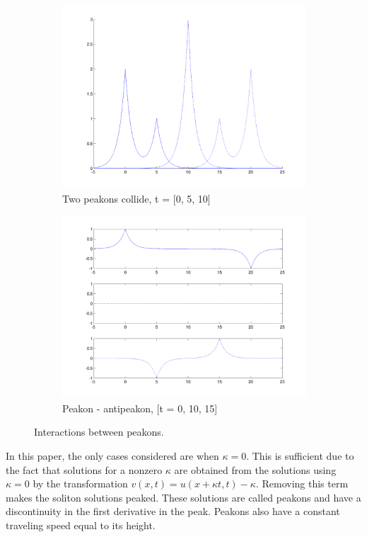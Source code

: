 \begin{figure}[h]
\begin{subfigure}[b]{0.49\textwidth}
                \includegraphics[width=\textwidth]{gfx/peakonovertake}
                \caption{Two peakons collide, t = [0, 5, 10]}
                \label{fig:peakonovertake}
        \end{subfigure}
        \begin{subfigure}[b]{0.49\textwidth}
                \includegraphics[width=\textwidth]{gfx/peakonantipeakon}
                \caption{Peakon - antipeakon, [t = 0, 10, 15]}
                \label{fig:peakonantipeakon}
        \end{subfigure}
        \caption{Interactions between peakons.}
\end{figure}

In this paper, the only cases considered are when $\kappa = 0$. This is sufficient due to the fact that solutions for a nonzero $\kappa$ are obtained from the solutions using $\kappa = 0$ by the transformation $v(x,t) = u(x + \kappa t, t) - \kappa$. Removing this term makes the soliton solutions peaked. These solutions are called peakons and have a discontinuity in the first derivative in the peak. Peakons also have a constant traveling speed equal to its height.

